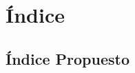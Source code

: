\chapter{\'{I}ndice}
\label{chap:index}

\section{\'{I}ndice Propuesto}
{
\renewcommand{\labelenumi}{\arabic{enumi}.}
\renewcommand{\labelenumii}{\arabic{enumi}.\arabic{enumii}}
\renewcommand{\labelenumiii}{\arabic{enumi}.\arabic{enumii}.\arabic{enumiii}}
\renewcommand{\labelenumiv}{\arabic{enumi}.\arabic{enumii}.\arabic{enumiii}.\arabic{enumiv}}


}
